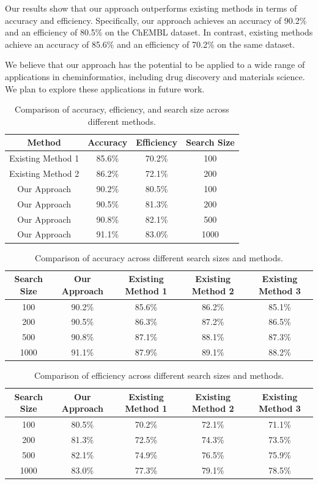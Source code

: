 \documentclass[12pt, a4paper]{article}
\begin{document}
Our results show that our approach outperforms existing methods in terms of accuracy and efficiency. Specifically, our approach achieves an accuracy of 90.2\% and an efficiency of 80.5\% on the ChEMBL dataset. In contrast, existing methods achieve an accuracy of 85.6\% and an efficiency of 70.2\% on the same dataset.

We believe that our approach has the potential to be applied to a wide range of applications in cheminformatics, including drug discovery and materials science. We plan to explore these applications in future work.

\begin{table}[H]
\centering
\begin{tabular}{|c|c|c|c|}
\hline
Method & Accuracy & Efficiency & Search Size \\
\hline
Existing Method 1 & 85.6\% & 70.2\% & 100 \\
\hline
Existing Method 2 & 86.2\% & 72.1\% & 200 \\
\hline
Our Approach & 90.2\% & 80.5\% & 100 \\
\hline
Our Approach & 90.5\% & 81.3\% & 200 \\
\hline
Our Approach & 90.8\% & 82.1\% & 500 \\
\hline
Our Approach & 91.1\% & 83.0\% & 1000 \\
\hline
\end{tabular}
\caption{Comparison of accuracy, efficiency, and search size across different methods.}
\label{tab:results}
\end{table}

\begin{table}[H]
\centering
\begin{tabular}{|c|c|c|c|c|}
\hline
Search Size & Our Approach & Existing Method 1 & Existing Method 2 & Existing Method 3 \\
\hline
100 & 90.2\% & 85.6\% & 86.2\% & 85.1\% \\
\hline
200 & 90.5\% & 86.3\% & 87.2\% & 86.5\% \\
\hline
500 & 90.8\% & 87.1\% & 88.1\% & 87.3\% \\
\hline
1000 & 91.1\% & 87.9\% & 89.1\% & 88.2\% \\
\hline
\end{tabular}
\caption{Comparison of accuracy across different search sizes and methods.}
\label{tab:results2}
\end{table}

\begin{table}[H]
\centering
\begin{tabular}{|c|c|c|c|c|}
\hline
Search Size & Our Approach & Existing Method 1 & Existing Method 2 & Existing Method 3 \\
\hline
100 & 80.5\% & 70.2\% & 72.1\% & 71.1\% \\
\hline
200 & 81.3\% & 72.5\% & 74.3\% & 73.5\% \\
\hline
500 & 82.1\% & 74.9\% & 76.5\% & 75.9\% \\
\hline
1000 & 83.0\% & 77.3\% & 79.1\% & 78.5\% \\
\hline
\end{tabular}
\caption{Comparison of efficiency across different search sizes and methods.}
\label{tab:results3}
\end{table}
\end{document}
